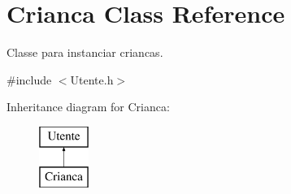 \hypertarget{class_crianca}{}\section{Crianca Class Reference}
\label{class_crianca}


Classe para instanciar criancas.  




{\ttfamily \#include $<$Utente.\+h$>$}

Inheritance diagram for Crianca\+:\begin{figure}[H]
\begin{center}
\leavevmode
\includegraphics[height=2.000000cm]{class_crianca}
\end{center}
\end{figure}

